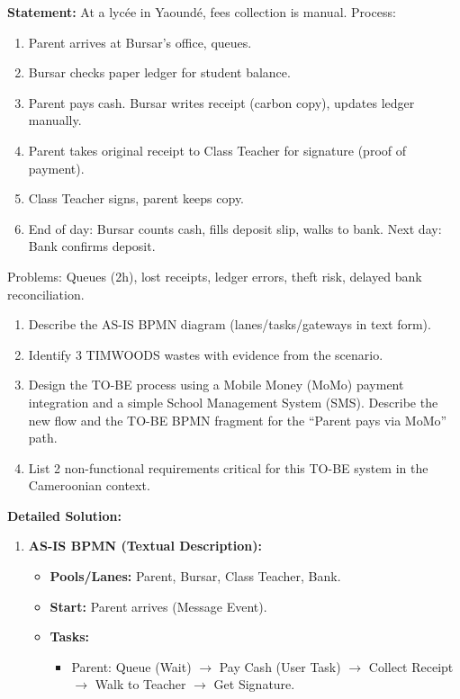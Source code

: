 \documentclass[11pt]{article}
\begin{document}
\begin{exoresolu}
\textbf{Statement:} At a lycée in Yaoundé, fees collection is manual. Process:
\begin{enumerate}
    \item Parent arrives at Bursar's office, queues.
    \item Bursar checks paper ledger for student balance.
    \item Parent pays cash. Bursar writes receipt (carbon copy), updates ledger manually.
    \item Parent takes original receipt to Class Teacher for signature (proof of payment).
    \item Class Teacher signs, parent keeps copy.
    \item End of day: Bursar counts cash, fills deposit slip, walks to bank. Next day: Bank confirms deposit.
\end{enumerate}
Problems: Queues (2h), lost receipts, ledger errors, theft risk, delayed bank reconciliation.
\begin{enumerate}
    \item Describe the AS-IS BPMN diagram (lanes/tasks/gateways in text form).
    \item Identify 3 TIMWOODS wastes with evidence from the scenario.
    \item Design the TO-BE process using a Mobile Money (MoMo) payment integration and a simple School Management System (SMS). Describe the new flow and the TO-BE BPMN fragment for the ``Parent pays via MoMo'' path.
    \item List 2 non-functional requirements critical for this TO-BE system in the Cameroonian context.
\end{enumerate}
\tcblower
\textbf{Detailed Solution:}
\begin{enumerate}
    \item \textbf{AS-IS BPMN (Textual Description):}
    \begin{itemize}
        \item \textbf{Pools/Lanes:} Parent, Bursar, Class Teacher, Bank.
        \item \textbf{Start:} Parent arrives (Message Event).
        \item \textbf{Tasks:}
        \begin{itemize}
            \item Parent: Queue (Wait) $\to$ Pay Cash (User Task) $\to$ Collect Receipt $\to$ Walk to Teacher $\to$ Get Signature.

\end{itemize}
\end{itemize}
\end{enumerate}
\end{exoresolu}
\end{document}
